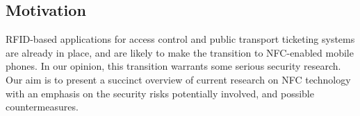 




\subsection{Motivation}
RFID-based applications for access control and public transport ticketing systems are already in place, and are likely to make the transition to NFC-enabled mobile phones.
In our opinion, this transition warrants some serious security research.
Our aim is to present a succinct overview of current research on NFC technology with an emphasis on the security risks potentially involved, and possible countermeasures.


